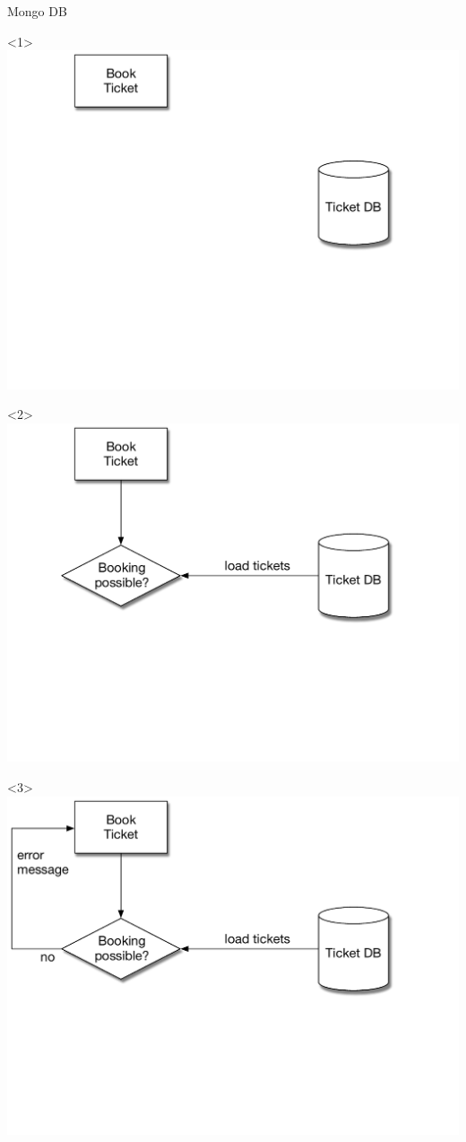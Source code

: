\begin{frame}[fragile]{Mongo DB}

\begin{center}

\begin{onlyenv}<1>
\includegraphics[width=.85\textwidth]{../OptimisticLocking1.pdf}
\end{onlyenv}

\begin{onlyenv}<2>
\includegraphics[width=.85\textwidth]{../OptimisticLocking2.pdf}
\end{onlyenv}

\begin{onlyenv}<3>
\includegraphics[width=.85\textwidth]{../OptimisticLocking3.pdf}
\end{onlyenv}


\end{center}
\end{frame}
